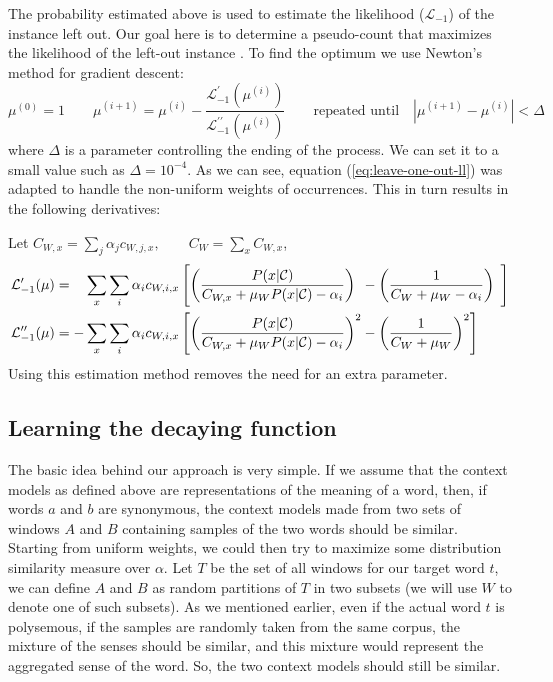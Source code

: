 \documentclass[english]{jnlp_1.4}
\begin{document}
The probability estimated above is used to estimate the likelihood
($\mathcal{L}_{-1}$) of the instance left out. Our goal here is to
determine a pseudo-count that maximizes the likelihood of the left-out
instance \cite{TwoStepSmooghing}. To find the optimum we use Newton's
method for gradient descent:
\[
\mu^{(0)}=1\qquad\mu^{(i+1)}=\mu^{(i)}-\frac{\mathcal{L}_{-1}^{\prime}(\mu^{(i)})}{\mathcal{L}_{-1}^{\prime\prime}(\mu^{(i)})}\qquad\mbox{repeated until}\quad\left|\mu^{(i+1)}-\mu^{(i)}\right|<\Delta\]
where $\Delta$ is a parameter controlling the ending of the process.
We can set it to a small value such as $\Delta=10^{-4}$. As we can
see, equation (\ref{eq:leave-one-out-ll}) was adapted to handle the
non-uniform weights of occurrences. This in turn results in the following
derivatives:

Let $C_{W,x}=\sum_{j}\alpha_{j}c_{W,j,x},\qquad C_{W}=\sum_{x}C_{W,x}$,
\begin{align*}
\mathcal{L}_{-1}^{\prime}(\mu) & = \hphantom{-}\sum_{x}\sum_{i}\alpha_{i}c_{W,i,x}\left[\left(\frac{P(x|\mathcal{C})}{C_{W,x}+\mu_{W}P(x|\mathcal{C})-\alpha_{i}}\right)^{\phantom{2}}-\left(\frac{1}{C_{W}+\mu_{W}-\alpha_{i}}\right)^{\phantom{2}}\right]\\
\mathcal{L}_{-1}^{\prime\prime}(\mu) & =  -\sum_{x}\sum_{i}\alpha_{i}c_{W,i,x}\left[\left(\frac{P(x|\mathcal{C})}{C_{W,x}+\mu_{W}P(x|\mathcal{C})-\alpha_{i}}\right)^{2}-\left(\frac{1}{C_{W}+\mu_{W}}\right)^{2}\right]
\end{align*}
Using this estimation method removes the need for an extra parameter.


\subsection{Learning the decaying function}
\label{sub:Learning-the-decaying}

The basic idea behind our approach is very simple. If we assume that
the context models as defined above are representations of the meaning
of a word, then, if words $a$ and $b$ are synonymous, the context
models made from two sets of windows $A$ and $B$ containing samples
of the two words should be similar. Starting from uniform weights,
we could then try to maximize some distribution similarity measure
over $\alpha$. Let $T$ be the set of all windows for our target
word $t$, we can define $A$ and $B$ as random partitions of $T$
in two subsets (we will use $W$ to denote one of such subsets). As
we mentioned earlier, even if the actual word $t$ is polysemous,
if the samples are randomly taken from the same corpus, the mixture
of the senses should be similar, and this mixture would represent
the aggregated sense of the word. So, the two context models should
still be similar.
\end{document}
